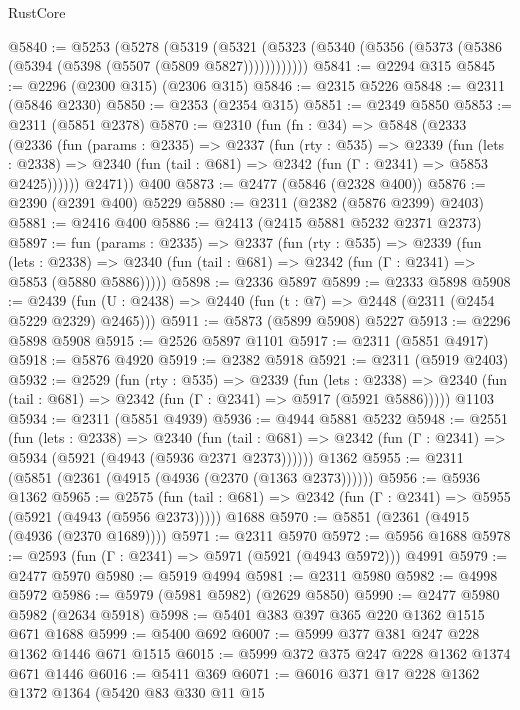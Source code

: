 \begin{lexlean}{RustCore}
\begin{coremodule}
@5840 := @5253
    (@5278
      (@5319 (@5321 (@5323 (@5340 (@5356 (@5373 (@5386 (@5394 (@5398 (@5507 (@5809 @5827))))))))))))
@5841 := @2294 @315
@5845 := @2296 (@2300 @315) (@2306 @315)
@5846 := @2315 @5226
@5848 := @2311 (@5846 @2330)
@5850 := @2353 (@2354 @315)
@5851 := @2349 @5850
@5853 := @2311 (@5851 @2378)
@5870 := @2310
    (fun (fn : @34) =>
    @5848
      (@2333
        (@2336
          (fun (params : @2335) =>
          @2337
            (fun (rty : @535) =>
            @2339
              (fun (lets : @2338) =>
              @2340 (fun (tail : @681) => @2342 (fun (Γ : @2341) => @5853 @2425))))))
        @2471))
    @400
@5873 := @2477 (@5846 (@2328 @400))
@5876 := @2390 (@2391 @400) @5229
@5880 := @2311 (@2382 (@5876 @2399) @2403)
@5881 := @2416 @400
@5886 := @2413 (@2415 @5881 @5232 @2371 @2373)
@5897 := fun (params : @2335) =>
  @2337
    (fun (rty : @535) =>
    @2339
      (fun (lets : @2338) =>
      @2340 (fun (tail : @681) => @2342 (fun (Γ : @2341) => @5853 (@5880 @5886)))))
@5898 := @2336 @5897
@5899 := @2333 @5898
@5908 := @2439 (fun (U : @2438) => @2440 (fun (t : @7) => @2448 (@2311 (@2454 @5229 @2329) @2465)))
@5911 := @5873 (@5899 @5908) @5227
@5913 := @2296 @5898 @5908
@5915 := @2526 @5897 @1101
@5917 := @2311 (@5851 @4917)
@5918 := @5876 @4920
@5919 := @2382 @5918
@5921 := @2311 (@5919 @2403)
@5932 := @2529
    (fun (rty : @535) =>
    @2339
      (fun (lets : @2338) =>
      @2340 (fun (tail : @681) => @2342 (fun (Γ : @2341) => @5917 (@5921 @5886)))))
    @1103
@5934 := @2311 (@5851 @4939)
@5936 := @4944 @5881 @5232
@5948 := @2551
    (fun (lets : @2338) =>
    @2340
      (fun (tail : @681) => @2342 (fun (Γ : @2341) => @5934 (@5921 (@4943 (@5936 @2371 @2373))))))
    @1362
@5955 := @2311 (@5851 (@2361 (@4915 (@4936 (@2370 (@1363 @2373))))))
@5956 := @5936 @1362
@5965 := @2575
    (fun (tail : @681) => @2342 (fun (Γ : @2341) => @5955 (@5921 (@4943 (@5956 @2373)))))
    @1688
@5970 := @5851 (@2361 (@4915 (@4936 (@2370 @1689))))
@5971 := @2311 @5970
@5972 := @5956 @1688
@5978 := @2593 (fun (Γ : @2341) => @5971 (@5921 (@4943 @5972))) @4991
@5979 := @2477 @5970
@5980 := @5919 @4994
@5981 := @2311 @5980
@5982 := @4998 @5972
@5986 := @5979 (@5981 @5982) (@2629 @5850)
@5990 := @2477 @5980 @5982 (@2634 @5918)
@5998 := @5401 @383 @397 @365 @220 @1362 @1515 @671 @1688
@5999 := @5400 @692
@6007 := @5999 @377 @381 @247 @228 @1362 @1446 @671 @1515
@6015 := @5999 @372 @375 @247 @228 @1362 @1374 @671 @1446
@6016 := @5411 @369
@6071 := @6016
    @371
    @17
    @228
    @1362
    @1372
    @1364
    (@5420
      @83
      @330
      @11
      @15

\end{coremodule}
\end{lexlean}

